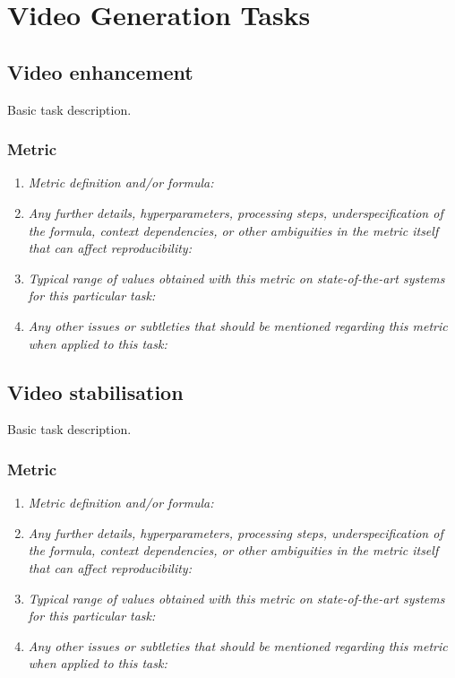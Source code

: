 \documentclass[a4paper,11pt]{article}
\begin{document}
\section{Video Generation Tasks}
    \subsection{Video enhancement}
        Basic task description.
        \subsubsection{Metric}
            \begin{enumerate}[label=\alph*.]
                \item \textit{Metric definition and/or formula:}
                \bigskip
                \item \textit{Any further details, hyperparameters, processing steps, underspecification of the formula, context dependencies, or other ambiguities in the metric itself that can affect reproducibility:}
                \bigskip
                \item \textit{Typical range of values obtained with this metric on state-of-the-art systems for this particular task:}
                \bigskip
                \item \textit{Any other issues or subtleties that should be mentioned regarding this metric when applied to this task:}
                \bigskip
            \end{enumerate}

    \subsection{Video stabilisation}
        Basic task description.
        \subsubsection{Metric}
            \begin{enumerate}[label=\alph*.]
                \item \textit{Metric definition and/or formula:}
                \bigskip
                \item \textit{Any further details, hyperparameters, processing steps, underspecification of the formula, context dependencies, or other ambiguities in the metric itself that can affect reproducibility:}
                \bigskip
                \item \textit{Typical range of values obtained with this metric on state-of-the-art systems for this particular task:}
                \bigskip
                \item \textit{Any other issues or subtleties that should be mentioned regarding this metric when applied to this task:}
                \bigskip
            \end{enumerate}
\end{document}
